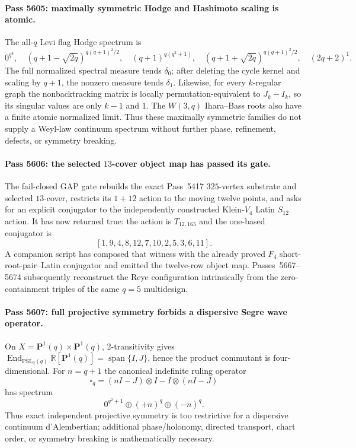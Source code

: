 \paragraph{Pass 5605: maximally symmetric Hodge and Hashimoto scaling is atomic.}
The all-$q$ Levi flag Hodge spectrum is
\[
0^{q^4},\quad(q+1-\sqrt{2q})^{q(q+1)^2/2},\quad
(q+1)^{q(q^2+1)},\quad(q+1+\sqrt{2q})^{q(q+1)^2/2},\quad(2q+2)^1.
\]
The full normalized spectral measure tends $\delta_0$; after deleting the
cycle kernel and scaling by $q+1$, the nonzero measure tends $\delta_1$.
Likewise, for every $k$-regular graph the nonbacktracking matrix is locally
permutation-equivalent to $J_k-I_k$, so its singular values are only
$k-1$ and $1$.  The $W(3,q)$ Ihara--Bass roots also have a finite atomic
normalized limit.  Thus these maximally symmetric families do not supply a
Weyl-law continuum spectrum without further phase, refinement, defects, or
symmetry breaking.

\paragraph{Pass 5606: the selected $13$-cover object map has passed its gate.}
The fail-closed GAP gate rebuilds the exact Pass~5417 $325$-vertex substrate and selected
$13$-cover, restricts its $1+12$ action to the moving twelve points, and asks
for an explicit conjugator to the independently constructed Klein-$V_4$ Latin
$S_{12}$ action.  It has now returned true: the action is $T_{12,165}$ and
the one-based conjugator is
\[
  [1,9,4,8,12,7,10,2,5,3,6,11].
\]
A companion script has composed that witness with the already proved $F_4$
short-root-pair--Latin conjugator and emitted the twelve-row object map.
Passes~5667--5674 subsequently reconstruct the Reye configuration intrinsically
from the zero-containment triples of the same $q=5$ multidesign.

\paragraph{Pass 5607: full projective symmetry forbids a dispersive Segre wave operator.}
On $X=\mathbf P^1(q)\times\mathbf P^1(q)$, 2-transitivity gives
$\operatorname{End}_{\mathrm{PSL}_2(q)}\mathbb R[\mathbf P^1(q)]
=\operatorname{span}\{I,J\}$, hence the product commutant is four-dimensional.
For $n=q+1$ the canonical indefinite ruling operator
\[
\boxed{\square_q=(nI-J)\otimes I-I\otimes(nI-J)}
\]
has spectrum
\[
\boxed{0^{q^2+1}\oplus(+n)^q\oplus(-n)^q.}
\]
Thus exact independent projective symmetry is too restrictive for a dispersive
continuum d'Alembertian; additional phase/holonomy, directed transport, chart
order, or symmetry breaking is mathematically necessary.

